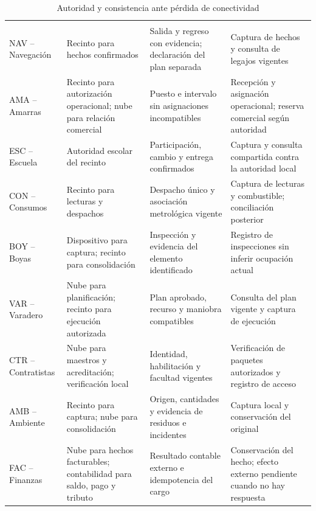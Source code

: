 \begingroup
\setlength{\tabcolsep}{3pt}
\begin{longtable}{@{}L{.24\textwidth}L{.20\textwidth}L{.28\textwidth}L{\dimexpr.28\textwidth-18pt\relax}@{}}
\caption{Autoridad y consistencia ante pérdida de conectividad}\label{tab:sd5_consistencia_dominios}\\
\hline
{} &  &  &  \\ \hline
\endfirsthead
\hline
{} &  &  &  \\ \hline
\endhead
NAV -- Navegación & Recinto para hechos confirmados & Salida y regreso con evidencia; declaración del plan separada & Captura de hechos y consulta de legajos vigentes \\
AMA -- Amarras & Recinto para autorización operacional; nube para relación comercial & Puesto e intervalo sin asignaciones incompatibles & Recepción y asignación operacional; reserva comercial según autoridad \\
ESC -- Escuela & Autoridad escolar del recinto & Participación, cambio y entrega confirmados & Captura y consulta compartida contra la autoridad local \\
CON -- Consumos & Recinto para lecturas y despachos & Despacho único y asociación metrológica vigente & Captura de lecturas y combustible; conciliación posterior \\
BOY -- Boyas & Dispositivo para captura; recinto para consolidación & Inspección y evidencia del elemento identificado & Registro de inspecciones sin inferir ocupación actual \\
VAR -- Varadero & Nube para planificación; recinto para ejecución autorizada & Plan aprobado, recurso y maniobra compatibles & Consulta del plan vigente y captura de ejecución \\
CTR -- Contratistas & Nube para maestros y acreditación; verificación local & Identidad, habilitación y facultad vigentes & Verificación de paquetes autorizados y registro de acceso \\
AMB -- Ambiente & Recinto para captura; nube para consolidación & Origen, cantidades y evidencia de residuos e incidentes & Captura local y conservación del original \\
FAC -- Finanzas & Nube para hechos facturables; contabilidad para saldo, pago y tributo & Resultado contable externo e idempotencia del cargo & Conservación del hecho; efecto externo pendiente cuando no hay respuesta \\

\end{longtable}
